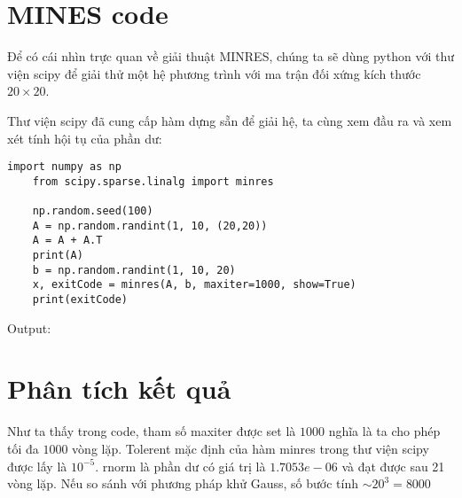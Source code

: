 \section{MINES code}
Để có cái nhìn trực quan về giải thuật MINRES, chúng ta sẽ dùng python với
thư viện scipy để giải thử một hệ phương trình với ma trận đối xứng kích thước $20 \times 20$.

Thư viện scipy đã cung cấp hàm dựng sẵn để giải hệ, ta cùng xem đầu ra và xem xét tính hội tụ của phần dư:

\begin{lstlisting}[style=code]
    import numpy as np
    from scipy.sparse.linalg import minres

    np.random.seed(100)
    A = np.random.randint(1, 10, (20,20))
    A = A + A.T
    print(A)
    b = np.random.randint(1, 10, 20)
    x, exitCode = minres(A, b, maxiter=1000, show=True)
    print(exitCode)
\end{lstlisting}
Output:

\section*{Phân tích kết quả}
Như ta thấy trong code, tham số maxiter được set là $1000$ nghĩa là ta cho phép tối đa $1000$ vòng lặp.
Tolerent mặc định của hàm minres trong thư viện scipy được lấy là $10^{-5}$. rnorm là phần dư có giá trị là $1.7053e-06$ 
và đạt được sau 21 vòng lặp. Nếu so sánh với phương pháp khử Gauss, số bước tính $\sim 20^3 = 8000$ 
